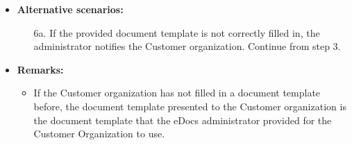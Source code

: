 \documentclass[a4paper,10pt]{article}
\begin{document}
\begin{itemize}
    \item \textbf{Alternative scenarios:} 
    \begin{enumerate}
        \item [6a.] If the provided document template is not correctly filled in, the administrator notifies the Customer organization. Continue from step 3.
    \end{enumerate}
    
    \item \textbf{Remarks:}
        \begin{itemize}
            \item If the Customer organization has not filled in a document template before, the document template presented to the Customer organization is the document template that the eDocs administrator provided for the Customer Organization to use.
        \end{itemize}
\end{itemize}
\end{document}
